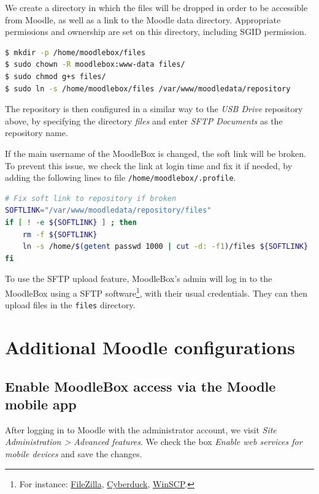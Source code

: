 \documentclass[12pt]{article}
\begin{document}
We create a directory in which the files will be dropped in order to be accessible from Moodle, as well as a link to the Moodle data directory.
Appropriate permissions and ownership are set on this directory, including SGID permission.

\begin{lstlisting}[language=bash]
$ mkdir -p /home/moodlebox/files
$ sudo chown -R moodlebox:www-data files/
$ sudo chmod g+s files/
$ sudo ln -s /home/moodlebox/files /var/www/moodledata/repository
\end{lstlisting}

The repository is then configured in a similar way to the \textsl{USB Drive} repository above, by specifying the directory \emph{files} and enter \emph{SFTP Documents} as the repository name.

If the main username of the MoodleBox is changed, the soft link will be broken.
To prevent this issue, we check the link at login time and fix it if needed, by adding the following lines to file \lstinline{/home/moodlebox/.profile}.

\begin{lstlisting}[language=bash]
# Fix soft link to repository if broken
SOFTLINK="/var/www/moodledata/repository/files"
if [ ! -e ${SOFTLINK} ] ; then
    rm -f ${SOFTLINK}
    ln -s /home/$(getent passwd 1000 | cut -d: -f1)/files ${SOFTLINK}
fi
\end{lstlisting}

To use the SFTP upload feature, MoodleBox's admin will log in to the MoodleBox using a SFTP software\footnote{For instance: \href{https://filezilla-project.org/}{FileZilla}, \href{https://cyberduck.io/}{Cyberduck}, \href{http://winscp.net/}{WinSCP}.}, with their usual credentials.
They can then upload files in the \lstinline{files} directory.

\section{Additional Moodle configurations}

\subsection{Enable MoodleBox access via the Moodle mobile app}

After logging in to Moodle with the administrator account, we visit \textsl{Site Administration > Advanced features}.
We check the box \emph{Enable web services for mobile devices} and save the changes.
\end{document}

